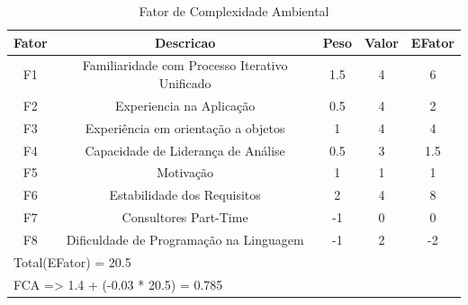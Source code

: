 \begin{table}[!htb]
\caption[FCA]{Fator de Complexidade Ambiental}
	\label{tab:correlacao}
	\centering
	\begin{tabular}{c|c|c|c|c}
		Fator & Descricao										                    & Peso	& Valor & EFator   \\   \hline
		F1	  & Familiaridade com Processo Iterativo Unificado	& 1.5	  &	 4    &		6		\\
		F2	  & Experiencia na Aplicação						            & 0.5	  &	 4    &		2 	 	\\
		F3 	  & Experiência em orientação a objetos				      & 1		  &  4    &		4 		\\
		F4 	  & Capacidade de Liderança de Análise				      & 0.5	  &	 3    &		1.5 		\\
		F5 	  & Motivação										                    & 1		  &	 1    &		1 		\\
		F6 	  & Estabilidade dos Requisitos						          & 2		  &  4    &		8 		\\
		F7 	  & Consultores Part-Time							              & -1	  &	 0    &		0 		\\
		F8 	  & Dificuldade de Programação na Linguagem			    & -1	  &	 2    &		-2 		\\ \hline
		\multicolumn{5}{l}{Total(EFator) = 20.5}\\ \hline
		\multicolumn{5}{l}{FCA => 1.4 + (-0.03 * 20.5) = 0.785}\\
	\end{tabular}
\end{table}


